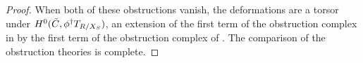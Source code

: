 \begin{proof}



When both of these obstructions vanish, the deformations are a torsor under $H^0(\tilde{C}, \phi^\dagger T_{R/X_S} )$, an extension of the first term of the obstruction complex in \cite[Proposition ]{Marcus2017Logarithmic-com} by the first term of the obstruction complex of \cite[Proposition ]{Marcus2017Logarithmic-com}. The comparison of the obstruction theories is complete. %
\end{proof}

